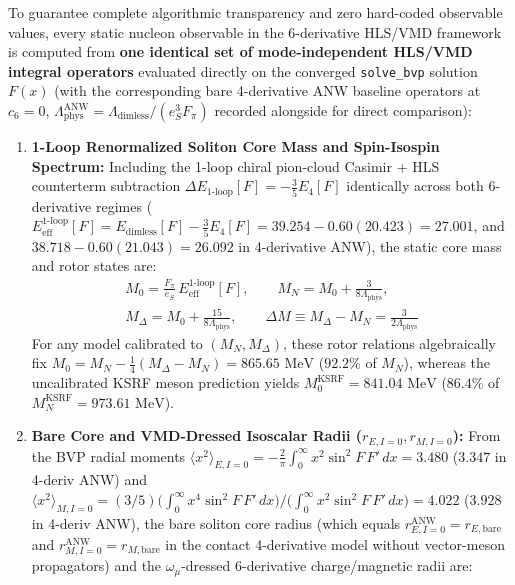 \documentclass[10pt,aps,prd,twocolumn,superscriptaddress,nofootinbib,floatfix,longbibliography,showkeys]{revtex4-2}
\begin{document}
To guarantee complete algorithmic transparency and zero hard-coded observable values, every static nucleon observable in the 6-derivative HLS/VMD framework is computed from \textbf{one identical set of mode-independent HLS/VMD integral operators} evaluated directly on the converged \texttt{solve\_bvp} solution $F(x)$ (with the corresponding bare 4-derivative ANW baseline operators \cite{ref43} at $c_6 = 0$, $\Lambda_{\text{phys}}^{\text{ANW}} = \Lambda_{\text{dimless}}/(e_S^3 F_\pi)$ recorded alongside for direct comparison):
\begin{enumerate}
  \item \textbf{1-Loop Renormalized Soliton Core Mass and Spin-Isospin Spectrum:} Including the 1-loop chiral pion-cloud Casimir + HLS counterterm subtraction $\Delta E_{\text{1-loop}}[F] = -\frac{3}{5}E_4[F]$ \cite{ref6,ref7,ref8} identically across both 6-derivative regimes ($E_{\text{eff}}^{\text{1-loop}}[F] = \allowbreak E_{\text{dimless}}[F] - \frac{3}{5}E_4[F] = \allowbreak 39.254 - 0.60(20.423) = 27.001$, and $38.718 - 0.60(21.043) = 26.092$ in 4-derivative ANW), the static core mass and rotor states are:
\begin{equation}\begin{gathered}
M_0 = \frac{F_\pi}{e_S}\,E_{\text{eff}}^{\text{1-loop}}[F], \qquad M_N = M_0 + \frac{3}{8\Lambda_{\text{phys}}}, \\
M_\Delta = M_0 + \frac{15}{8\Lambda_{\text{phys}}}, \qquad \Delta M \equiv M_\Delta - M_N = \frac{3}{2\Lambda_{\text{phys}}}
\end{gathered}\end{equation}
  For any model calibrated to $(M_N, M_\Delta)$, these rotor relations algebraically fix $M_0 = M_N - \frac{1}{4}(M_\Delta - M_N) = 865.65\text{ MeV}$ ($92.2\%$ of $M_N$), whereas the uncalibrated KSRF meson prediction yields $M_0^{\text{KSRF}} = 841.04\text{ MeV}$ ($86.4\%$ of $M_N^{\text{KSRF}} = 973.61\text{ MeV}$).
  \item \textbf{Bare Core and VMD-Dressed Isoscalar Radii ($r_{E,I=0}, r_{M,I=0}$):} From the BVP radial moments $\langle x^2 \rangle_{E,I=0} = \allowbreak -\frac{2}{\pi}\int_0^\infty x^2 \sin^2 F\,F'\,dx = \allowbreak 3.480$ ($3.347$ in 4-deriv ANW) and $\langle x^2 \rangle_{M,I=0} = \allowbreak (3/5)\allowbreak\bigl(\int_0^\infty x^4 \sin^2 F\,F'\,dx\bigr) / \allowbreak \bigl(\int_0^\infty x^2 \sin^2 F\,F'\,dx\bigr) = \allowbreak 4.022$ ($3.928$ in 4-deriv ANW), the bare soliton core radius (which equals $r_{E,I=0}^{\text{ANW}} = r_{E,\text{bare}}$ and $r_{M,I=0}^{\text{ANW}} = r_{M,\text{bare}}$ in the contact 4-derivative model without vector-meson propagators) and the $\omega_\mu$-dressed 6-derivative charge/magnetic radii are:

\end{enumerate}
\end{document}
